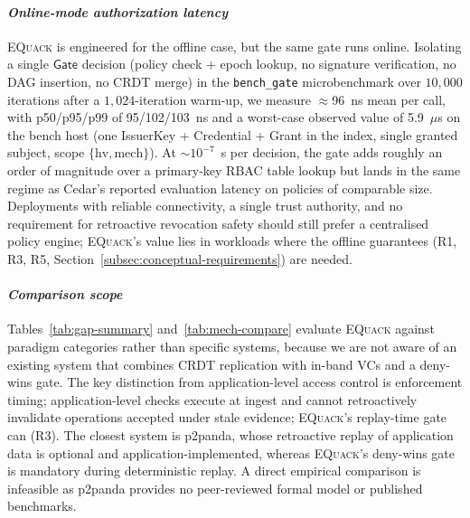 \documentclass[10pt,journal,compsoc]{IEEEtran}
\newcommand{\equack}{\textsc{EQuack}}
\begin{document}
\paragraph*{\textit{Online-mode authorization latency}}
\equack{} is engineered for the offline case, but the same gate runs online. Isolating a single $\mathsf{Gate}$ decision (policy check + epoch lookup, no signature verification, no DAG insertion, no CRDT merge) in the \texttt{bench\_gate} microbenchmark over $10{,}000$ iterations after a $1{,}024$-iteration warm-up, we measure $\approx$96~ns mean per call, with p50/p95/p99 of 95/102/103~ns and a worst-case observed value of 5.9~$\mu$s on the bench host (one IssuerKey + Credential + Grant in the index, single granted subject, scope $\{\text{hv},\text{mech}\}$). At $\sim$$10^{-7}$~s per decision, the gate adds roughly an order of magnitude over a primary-key RBAC table lookup but lands in the same regime as Cedar's reported evaluation latency on policies of comparable size. Deployments with reliable connectivity, a single trust authority, and no requirement for retroactive revocation safety should still prefer a centralised policy engine; \equack{}'s value lies in workloads where the offline guarantees (R1, R3, R5, Section~\ref{subsec:conceptual-requirements}) are needed.

\paragraph*{\textit{Comparison scope}}
Tables~\ref{tab:gap-summary} and~\ref{tab:mech-compare} evaluate \equack{} against paradigm categories rather than specific systems, because we are not aware of an existing system that combines CRDT replication with in-band VCs and a deny-wins gate. The key distinction from application-level access control is enforcement timing; application-level checks execute at ingest and cannot retroactively invalidate operations accepted under stale evidence; \equack{}'s replay-time gate can (R3). The closest system is p2panda, whose retroactive replay of application data is optional and application-implemented, whereas \equack{}'s deny-wins gate is mandatory during deterministic replay. A direct empirical comparison is infeasible as p2panda provides no peer-reviewed formal model or published benchmarks.
\end{document}
